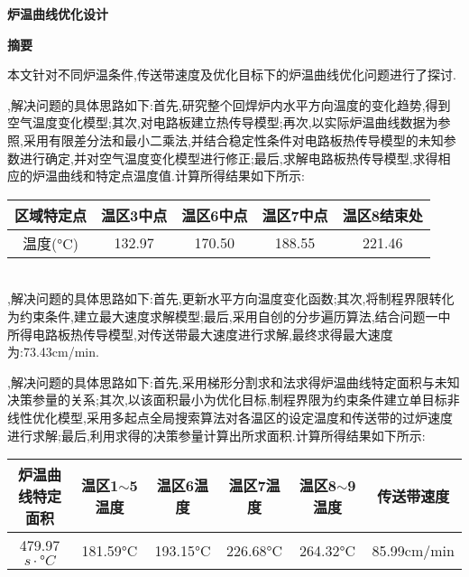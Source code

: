\documentclass[12pt]{ctexart}
\numberwithin{figure}{section}
\numberwithin{table}{section}
\begin{document}
\pagestyle{plain}
\begin{center}
\LARGE{\textbf{炉温曲线优化设计}}
\end{center}

\begin{center}
\large{\textbf{摘要}}
\end{center}

本文针对不同炉温条件,传送带速度及优化目标下的炉温曲线优化问题进行了探讨.

,解决问题的具体思路如下:首先,研究整个回焊炉内水平方向温度的变化趋势,得到空气温度变化模型;其次,对电路板建立热传导模型;再次,以实际炉温曲线数据为参照,采用有限差分法和最小二乘法,并结合稳定性条件对电路板热传导模型的未知参数进行确定,并对空气温度变化模型进行修正;最后,求解电路板热传导模型,求得相应的炉温曲线和特定点温度值.计算所得结果如下所示:
\begin{longtable}
\centering
\caption*{}
\small{\begin{tabular}{c|c|c|c|c}
\hline
区域特定点&温区3中点&温区6中点&温区7中点&温区8结束处\\
\hline
温度(°C)&132.97&170.50&188.55&221.46\\
\hline
    \end{tabular}}
    \end{longtable}\\
,解决问题的具体思路如下:首先,更新水平方向温度变化函数;其次,将制程界限转化为约束条件,建立最大速度求解模型;最后,采用自创的分步遍历算法,结合问题一中所得电路板热传导模型,对传送带最大速度进行求解,最终求得最大速度为:73.43cm/min.

,解决问题的具体思路如下:首先,采用梯形分割求和法求得炉温曲线特定面积与未知决策参量的关系;其次,以该面积最小为优化目标,制程界限为约束条件建立单目标非线性优化模型,采用多起点全局搜索算法对各温区的设定温度和传送带的过炉速度进行求解;最后,利用求得的决策参量计算出所求面积.计算所得结果如下所示:
\begin{longtable}
\centering
\caption*{}
\small{\begin{tabular}{c|c|c|c|c|c}
\hline
炉温曲线特定面积&温区1$\sim$5温度&温区6温度&温区7温度&温区8$\sim$9温度&传送带速度\\
\hline
479.97$s\cdot°C$&181.59°C&193.15°C&226.68°C&264.32°C&85.99cm/min\\
\hline
    \end{tabular}}
    \end{longtable}\\
\end{document}
